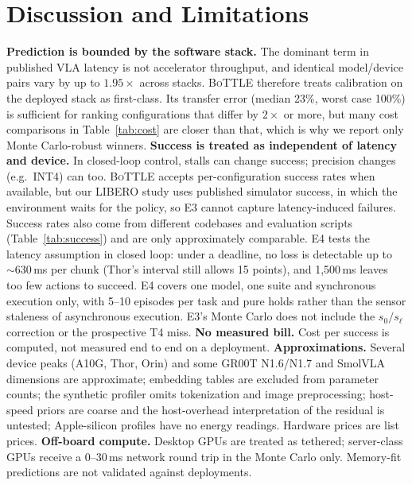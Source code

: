 \documentclass[10pt]{article}
\newcommand{\bottle}{\textsc{BoTTLE}}
\begin{document}
\section{Discussion and Limitations}
\textbf{Prediction is bounded by the software stack.} The dominant term in published VLA latency
is not accelerator throughput, and identical model/device pairs vary by up to $1.95\times$ across
stacks. \bottle{} therefore treats calibration on the deployed stack as first-class. Its
transfer error (median 23\%, worst case 100\%) is sufficient for ranking configurations that
differ by $2\times$ or more, but many cost comparisons in Table~\ref{tab:cost} are closer than
that, which is why we report only Monte Carlo-robust winners.
\textbf{Success is treated as independent of latency and device.} In closed-loop control, stalls
can change success; precision changes (e.g.\ INT4) can too. \bottle{} accepts per-configuration
success rates when available, but our LIBERO study uses published simulator success, in which the
environment waits for the policy, so E3 cannot capture latency-induced failures. Success rates
also come from different codebases and evaluation scripts (Table~\ref{tab:success}) and are only
approximately comparable. E4 tests the latency assumption in closed loop: under a deadline,
no loss is detectable up to ${\sim}630$\,ms per chunk (Thor's interval still allows 15 points),
and 1{,}500\,ms leaves too few actions to succeed. E4 covers one model, one suite and synchronous execution only, with 5--10
episodes per task and pure holds rather than the sensor staleness of asynchronous execution.
E3's Monte Carlo does not include the $s_0/s_\ell$ correction or the prospective T4 miss.
\textbf{No measured bill.} Cost per success is computed, not measured end to end on a deployment.
\textbf{Approximations.} Several device peaks (A10G, Thor, Orin) and some GR00T N1.6/N1.7 and
SmolVLA dimensions are approximate; embedding tables are excluded from parameter counts; the
synthetic profiler omits tokenization and image preprocessing; host-speed priors are coarse and
the host-overhead interpretation of the residual is untested;
Apple-silicon profiles have no energy readings. Hardware prices are list prices.
\textbf{Off-board compute.} Desktop GPUs are treated as tethered; server-class GPUs receive a
0--30\,ms network round trip in the Monte Carlo only. Memory-fit predictions are not validated
against deployments.
\end{document}

